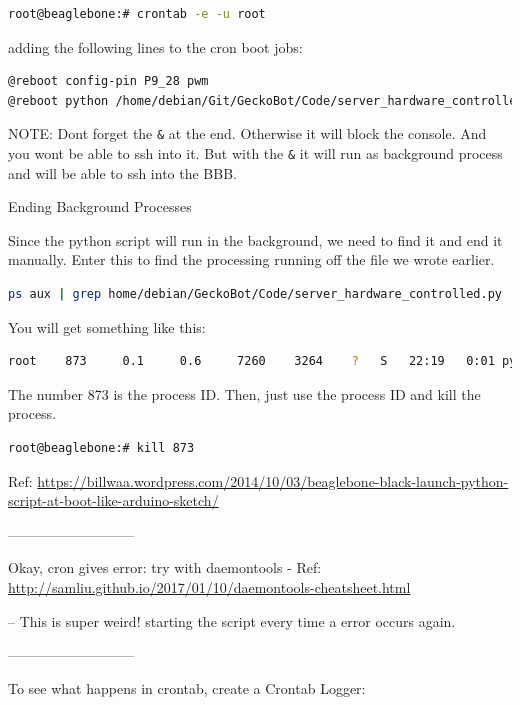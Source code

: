 \documentclass[
	fontsize=10pt
	paper=a4
]{scrartcl}
\begin{document}
\begin{lstlisting}[language=bash]
root@beaglebone:# crontab -e -u root
\end{lstlisting}

adding the following lines to the cron boot jobs:
\begin{lstlisting}[language=bash]
@reboot config-pin P9_28 pwm
@reboot python /home/debian/Git/GeckoBot/Code/server_hardware_controlled.py &
\end{lstlisting}

NOTE: Dont forget the \texttt{\&} at the end. Otherwise it will block the console.
And you wont be able to ssh into it.
But with the \texttt{\&} it will run as background process and will be able to ssh into
the BBB.

Ending Background Processes

Since the python script will run in the background, we need to find it and
end it manually. Enter this to find the processing running off the file we
wrote earlier.

\begin{lstlisting}[language=bash]
ps aux | grep home/debian/GeckoBot/Code/server_hardware_controlled.py
\end{lstlisting}

You will get something like this:
\begin{lstlisting}[language=bash]
    root    873     0.1     0.6     7260    3264    ?   S   22:19   0:01 python home/debian/GeckoBot/Code/server_hardware_controlled.py
\end{lstlisting}

The number 873 is the process ID. Then, just use the process ID and kill
the process.

\begin{lstlisting}[language=bash]
root@beaglebone:# kill 873
\end{lstlisting}

Ref:
\url{https://billwaa.wordpress.com/2014/10/03/beaglebone-black-launch-python-script-at-boot-like-arduino-sketch/}

---------------------------

Okay, cron gives error:
try with daemontools - Ref:
\url{http://samliu.github.io/2017/01/10/daemontools-cheatsheet.html}

-- This is super weird! starting the script every time a error occurs again.


---------------------------

To see what happens in crontab, create a Crontab Logger:
\end{document}
